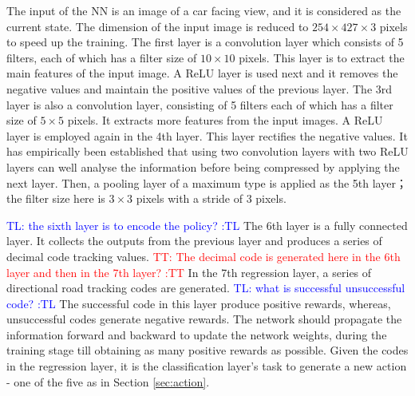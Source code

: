 \documentclass{svproc}
\newcommand{\tl}[1]{\textcolor{blue} {TL: #1 :TL} }
\renewcommand{\tt}[1]{\textcolor{red} {TT: #1 :TT} }
\begin{document}
The input of the NN is an image of a car facing view, and it is considered as the current state. The dimension of the input image is reduced to $254 \times 427 \times 3$ pixels to speed up the training. The first layer is a convolution layer which consists of 5 filters, each of which has a filter size of $10 \times 10$ pixels. This layer is to extract the main features of the input image. A ReLU layer is used next and it removes the negative values and maintain the positive values of the previous layer. The 3rd layer is also a convolution layer, consisting of 5 filters each of which has a filter size of $5 \times 5$ pixels. It extracts more features from the input images. A ReLU layer is employed again in the 4th layer. This layer rectifies the negative values. It has empirically been established that using two convolution layers with two ReLU layers can well analyse the information before being compressed by applying the next layer. Then, a pooling layer of a maximum type is applied as the 5th layer； the filter size here is $3 \times 3$ pixels with a stride of 3 pixels. 

\tl{the sixth layer is to encode the policy?}
The 6th layer is a fully connected layer. It collects the outputs from the previous layer and produces a series of decimal code tracking values. \tt{The decimal code is generated here in the 6th layer and then in the 7th layer?}In the 7th regression layer, a series of directional road tracking codes are generated. \tl{what is successful unsuccessful code?} The successful code in this layer produce positive rewards, whereas, unsuccessful codes generate negative rewards. The network should propagate the information forward and backward to update the network weights, during the training stage till obtaining as many positive rewards as possible. Given the codes in the regression layer, it is the classification layer's task to generate a new action - one of the five as in Section \ref{sec:action}. 
\end{document}
